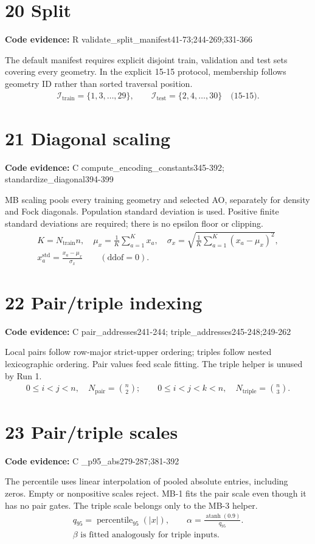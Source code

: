 \documentclass[10pt,a4paper]{article}
\newcommand{\stage}[2]{\section*{#1}\textbf{Code evidence:} #2\par}
\begin{document}
\par\noindent\begin{minipage}{\linewidth}
\stage{20 Split}{R validate\_split\_manifest41-73;244-269;331-366}
The default manifest requires explicit disjoint train, validation and test sets covering every geometry. In the explicit 15-15 protocol, membership follows geometry ID rather than sorted traversal position.
\[
\begin{gathered}
\mathcal I_{\mathrm{train}}=\{1,3,\ldots,29\},\qquad \mathcal I_{\mathrm{test}}=\{2,4,\ldots,30\}\quad\text{(15-15)}.
\end{gathered}
\]
\end{minipage}\par\vspace{4pt}
\par\noindent\begin{minipage}{\linewidth}
\stage{21 Diagonal scaling}{C compute\_encoding\_constants345-392; standardize\_diagonal394-399}
MB scaling pools every training geometry and selected AO, separately for density and Fock diagonals. Population standard deviation is used. Positive finite standard deviations are required; there is no epsilon floor or clipping.
\[
\begin{gathered}
K=N_{\mathrm{train}}n,\quad \mu_x=\frac1K\sum_{a=1}^Kx_a,\quad \sigma_x=\sqrt{\frac1K\sum_{a=1}^K(x_a-\mu_x)^2},\\ x_a^{\mathrm{std}}=\frac{x_a-\mu_x}{\sigma_x}\qquad (\mathrm{ddof}=0).
\end{gathered}
\]
\end{minipage}\par\vspace{4pt}
\par\noindent\begin{minipage}{\linewidth}
\stage{22 Pair/triple indexing}{C pair\_addresses241-244; triple\_addresses245-248;249-262}
Local pairs follow row-major strict-upper ordering; triples follow nested lexicographic ordering. Pair values feed scale fitting. The triple helper is unused by Run 1.
\[
\begin{gathered}
0\le i<j<n,\quad N_{\mathrm{pair}}=\binom n2;\qquad 0\le i<j<k<n,\quad N_{\mathrm{triple}}=\binom n3.
\end{gathered}
\]
\end{minipage}\par\vspace{4pt}
\par\noindent\begin{minipage}{\linewidth}
\stage{23 Pair/triple scales}{C \_p95\_abs279-287;381-392}
The percentile uses linear interpolation of pooled absolute entries, including zeros. Empty or nonpositive scales reject. MB-1 fits the pair scale even though it has no pair gates. The triple scale belongs only to the MB-3 helper.
\[
\begin{gathered}
q_{95}=\operatorname{percentile}_{95}(|x|),\qquad \alpha=\frac{\operatorname{atanh}(0.9)}{q_{95}}.\\ \beta\text{ is fitted analogously for triple inputs.}
\end{gathered}
\]
\end{minipage}\par\vspace{4pt}
\end{document}
